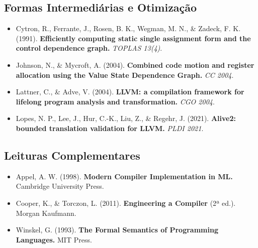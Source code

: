 \subsection{Formas Intermediárias e Otimização}

\begin{itemize}
  \item Cytron, R., Ferrante, J., Rosen, B. K., Wegman, M. N., \&
    Zadeck, F. K. (1991). \textbf{Efficiently computing static single
    assignment form and the control dependence graph.}
    \emph{TOPLAS 13(4)}.
  \item Johnson, N., \& Mycroft, A. (2004).
    \textbf{Combined code motion and register allocation using the
    Value State Dependence Graph.} \emph{CC 2004}.
  \item Lattner, C., \& Adve, V. (2004).
    \textbf{LLVM: a compilation framework for lifelong program analysis
    and transformation.} \emph{CGO 2004}.
  \item Lopes, N. P., Lee, J., Hur, C.-K., Liu, Z., \& Regehr, J.
    (2021). \textbf{Alive2: bounded translation validation for LLVM.}
    \emph{PLDI 2021}.
\end{itemize}

\subsection{Leituras Complementares}

\begin{itemize}
  \item Appel, A. W. (1998).
    \textbf{Modern Compiler Implementation in ML.}
    Cambridge University Press.
  \item Cooper, K., \& Torczon, L. (2011).
    \textbf{Engineering a Compiler} (2ª ed.). Morgan Kaufmann.
  \item Winskel, G. (1993).
    \textbf{The Formal Semantics of Programming Languages.} MIT Press.
\end{itemize}
